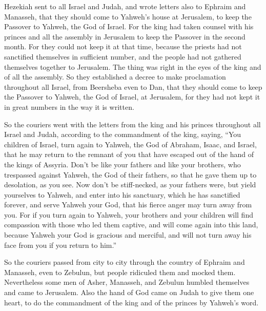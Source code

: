  Hezekiah sent to all Israel and Judah, and wrote letters
also to Ephraim and Manasseh, that they should come to Yahweh's house at
Jerusalem, to keep the Passover to Yahweh, the God of Israel.
 For the king had taken counsel with his princes and all
the assembly in Jerusalem to keep the Passover in the second month.
 For they could not keep it at that time, because the
priests had not sanctified themselves in sufficient number, and the
people had not gathered themselves together to Jerusalem. 
The thing was right in the eyes of the king and of all the assembly.
 So they established a decree to make proclamation
throughout all Israel, from Beersheba even to Dan, that they should come
to keep the Passover to Yahweh, the God of Israel, at Jerusalem, for
they had not kept it in great numbers in the way it is written.

 So the couriers went with the letters from the king and
his princes throughout all Israel and Judah, according to the
commandment of the king, saying, ``You children of Israel, turn again to
Yahweh, the God of Abraham, Isaac, and Israel, that he may return to the
remnant of you that have escaped out of the hand of the kings of
Assyria.  Don't be like your fathers and like your
brothers, who trespassed against Yahweh, the God of their fathers, so
that he gave them up to desolation, as you see.  Now don't
be stiff-necked, as your fathers were, but yield yourselves to Yahweh,
and enter into his sanctuary, which he has sanctified forever, and serve
Yahweh your God, that his fierce anger may turn away from you.
 For if you turn again to Yahweh, your brothers and your
children will find compassion with those who led them captive, and will
come again into this land, because Yahweh your God is gracious and
merciful, and will not turn away his face from you if you return to
him.''

 So the couriers passed from city to city through the
country of Ephraim and Manasseh, even to Zebulun, but people ridiculed
them and mocked them.  Nevertheless some men of Asher,
Manasseh, and Zebulun humbled themselves and came to Jerusalem.
 Also the hand of God came on Judah to give them one
heart, to do the commandment of the king and of the princes by Yahweh's
word.

